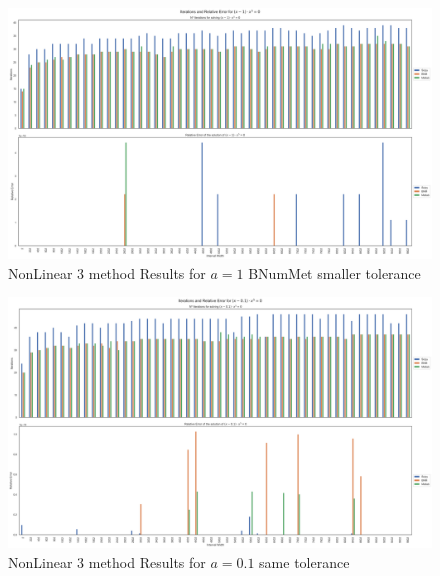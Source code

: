 \begin{figure}
    \centering
    \includegraphics[width=\textwidth]{Include/Images/Thesis/Analysis of Solutions/NonLinear AS/NonLinear 3 method Results Small Tol Bnum a-1.png}
    \caption{NonLinear 3 method Results for $a=1$ BNumMet smaller tolerance}
    \label{fig:NonLinear 3 method Results for a=1 BNumMet smaller tolerance}
\end{figure}

\begin{figure}
    \centering
    \includegraphics[width=\textwidth]{Include/Images/Thesis/Analysis of Solutions/NonLinear AS/NonLinear 3 method Results a-0.1.png}
    \caption{NonLinear 3 method Results for $a=0.1$ same tolerance}
\label{fig:NonLinear 3 method Results for a=0.1 same tolerance}
\end{figure}

